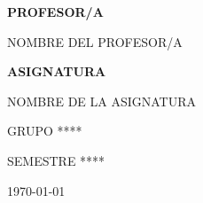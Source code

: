 \documentclass[12pt,letterpaper]{article}                       %
\begin{document}
\begin{titlepage}
    \vfill                                                          %
    {\bfseries\Large PROFESOR/A \par}                               %
    \vspace{0.1cm}                                                  %
    {\large NOMBRE DEL PROFESOR/A \par}                             %

    \vfill                                                          %
    {\bfseries\Large ASIGNATURA \par}
    \vspace{0.1cm}                                                  %
    {\large NOMBRE DE LA ASIGNATURA \par}                           %

    \vfill                                                          %
    {\Large GRUPO **** \par}                                        %

    \vfill                                                          %
    {\Large SEMESTRE **** \par}                                     %

    \vfill                                                          %
    {\Large \today \par}                                            %

\end{titlepage}
\end{document}
